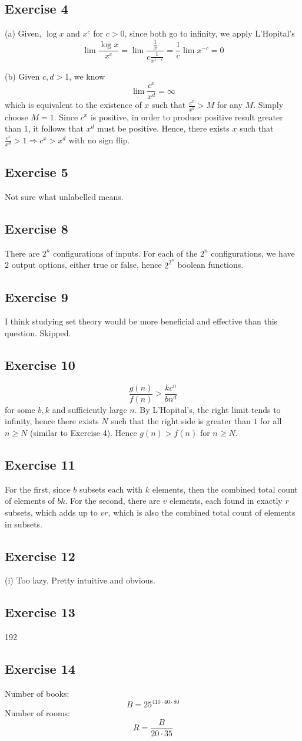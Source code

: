 \documentclass{book}
\begin{document}
\subsection*{Exercise 4}
(a)
Given, $\log x$ and $x^c$ for $c > 0$, since both go to infinity, we apply L'Hopital's
$$\lim \frac{\log x}{x^c} = \lim \frac{\frac{1}{x}}{c\frac{1}{x^{1 - c}}} = \frac{1}{c} \lim x^{-c} = 0$$

\noindent
(b)
Given $c, d > 1$, we know
$$\lim \frac{c^x}{x^d} = \infty$$
which is equivalent to the existence of $x$ such that $\frac{c^x}{x^d} > M$ for any $M$. Simply choose $M = 1$. Since $c^x$ is positive, in order to produce positive result greater than $1$, it follows that  $x^d$ must be positive. Hence, there exists $x$ such that $\frac{c^x}{x^d} > 1 \Rightarrow c^x > x^d$ with no sign flip.

\subsection*{Exercise 5}
Not sure what unlabelled means.

\subsection*{Exercise 8}
There are $2^n$ configurations of inputs. For each of the $2^n$ configurations, we have 2 output options, either true or false, hence $2^{2^n}$ boolean functions.

\subsection*{Exercise 9}
I think studying set theory would be more beneficial and effective than this question. Skipped.

\subsection*{Exercise 10}
$$\frac{g(n)}{f(n)} > \frac{kc^n}{bn^d}$$
for some $b, k$ and sufficiently large $n$. By L'Hopital's, the right limit tends to infinity, hence there exists $N$ such that the right side is greater than $1$ for all $n \geq N$ (similar to Exercise 4). Hence $g(n) > f(n)$ for $n \geq N$.

\subsection*{Exercise 11}
For the first, since $b$ subsets each with $k$ elements, then the combined total count of elements of $bk$. For the second, there are $v$ elements, each found in exactly $r$ subsets, which adds up to $vr$, which is also the combined total count of elements in subsets.

\subsection*{Exercise 12}
(i)
Too lazy. Pretty intuitive and obvious.

\subsection*{Exercise 13}
192

\subsection*{Exercise 14}
Number of books:
$$B = 25^{410 \cdot 40 \cdot 80}$$
Number of rooms:
$$R = \frac{B}{20 \cdot 35}$$
\end{document}
